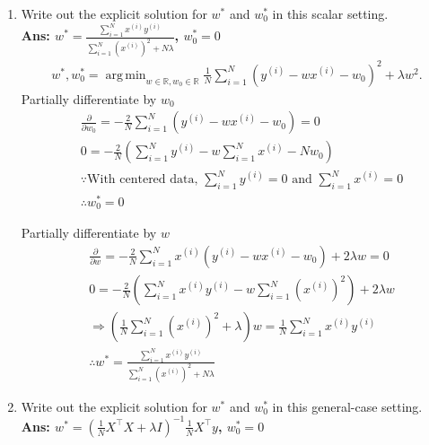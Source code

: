 \documentclass{article}
\DeclareMathOperator*{\argmin}{arg\,min}
\theoremstyle{definition}
\theoremstyle{remark}
\begin{document}
\begin{enumerate}[font={\Large\bfseries},left=0pt]
\begin{tcolorbox}
\begin{enumerate}
			\item Write out the explicit solution for $w^*$ and $w^*_0$ in this scalar setting. \\
			      \textbf{Ans: $w^* = \frac{\sum_{i=1}^{N}x^{(i)}y^{(i)}}{\sum_{i=1}^{N}(x^{(i)})^2 + N\lambda}$, $w_0^* = 0$}
			      \begin{align}
				      w^*, w_0^* = \argmin_{w\in \mathbb{R}, w_0\in \mathbb{R}} \frac{1}{N}\sum_{i=1}^N \left( y^{(i)} - w x^{(i)} - w_0 \right)^2 + \lambda w^2.
			      \end{align}
			      Partially differentiate by $w_0$
			      \begin{align}
				       & \frac{\partial}{\partial w_0} = -\frac{2}{N} \sum^N_{i = 1} \left( y^{(i)} - w x^{(i)} - w_0 \right) = 0 \\
				       & 0 = -\frac{2}{N} \left( \sum_{i=1}^N y^{(i)} - w\sum_{i=1}^N x^{(i)} - Nw_0 \right)                      \\
				       & \because \text{With centered data, } \sum_{i=1}^N y^{(i)} = 0 \text{ and } \sum_{i=1}^N x^{(i)} = 0      \\
				       & \therefore w_0^* = 0
			      \end{align}

			      Partially differentiate by $w$
			      \begin{align}
				       & \frac{\partial}{\partial w}
				      = -\frac{2}{N} \sum_{i=1}^N x^{(i)} \left( y^{(i)} - w x^{(i)} - w_0 \right)
				      + 2\lambda w = 0                                                                                        \\
				       & 0 = -\frac{2}{N} \left( \sum_{i=1}^N x^{(i)}y^{(i)} - w\sum_{i=1}^N (x^{(i)})^2 \right) + 2\lambda w \\
				       & \Rightarrow \left( \frac{1}{N}\sum_{i=1}^N (x^{(i)})^2 + \lambda \right) w
				      = \frac{1}{N} \sum_{i=1}^N x^{(i)}y^{(i)}                                                               \\
				       & \therefore w^* = \frac{\sum_{i=1}^{N}x^{(i)}y^{(i)}}{\sum_{i=1}^{N}(x^{(i)})^2 + N\lambda}
			      \end{align}

			\item Write out the explicit solution for $w^*$ and $w^*_0$ in this general-case setting. \\
			      \textbf{Ans: $w^* = \left(\frac{1}{N}X^\intercal X + \lambda I\right)^{-1}\frac{1}{N}X^\intercal y$,  $w_0^* = 0$}


\end{enumerate}
\end{tcolorbox}
\end{enumerate}
\end{document}
